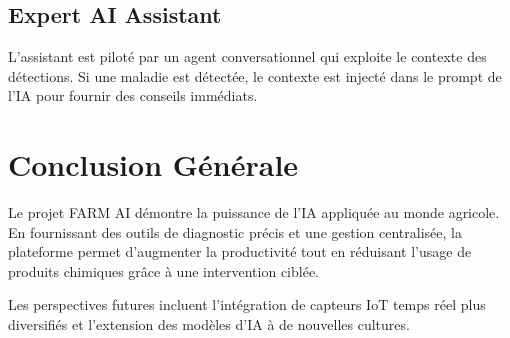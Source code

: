 \documentclass[12pt,a4paper,oneside]{report}
\begin{document}
\section{Expert AI Assistant}
L'assistant est piloté par un agent conversationnel qui exploite le contexte des détections. Si une maladie est détectée, le contexte est injecté dans le prompt de l'IA pour fournir des conseils immédiats.

\chapter*{Conclusion Générale}

Le projet FARM AI démontre la puissance de l'IA appliquée au monde agricole. En fournissant des outils de diagnostic précis et une gestion centralisée, la plateforme permet d'augmenter la productivité tout en réduisant l'usage de produits chimiques grâce à une intervention ciblée.

Les perspectives futures incluent l'intégration de capteurs IoT temps réel plus diversifiés et l'extension des modèles d'IA à de nouvelles cultures.
\end{document}

